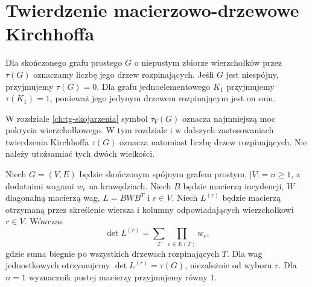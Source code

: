 \section{Twierdzenie macierzowo-drzewowe Kirchhoffa}
\label{sec:tg-matrix-tree}

\begin{definicja}
Dla skończonego grafu prostego $G$ o niepustym
zbiorze wierzchołków przez $\tau(G)$ oznaczamy liczbę jego drzew rozpinających.
Jeśli $G$ jest niespójny, przyjmujemy $\tau(G)=0$.
Dla grafu jednoelementowego $K_1$ przyjmujemy
$\tau(K_1)=1$, ponieważ jego jedynym drzewem
rozpinającym jest on sam.
\end{definicja}

\begin{uwaga}
W rozdziale \ref{ch:tg-skojarzenia} symbol
$\tau_V(G)$ oznacza najmniejszą moc pokrycia
wierzchołkowego. W tym rozdziale i w dalszych
zastosowaniach twierdzenia Kirchhoffa
$\tau(G)$ oznacza natomiast liczbę drzew
rozpinających. Nie należy utożsamiać
tych dwóch wielkości.
\end{uwaga}

\begin{twierdzenie}
\label{thm:tg-kirchhoff}
Niech $G=(V,E)$ będzie skończonym spójnym grafem prostym,
$|V|=n\ge1$, z dodatnimi wagami $w_e$ na krawędziach.
Niech $B$ będzie macierzą incydencji, $W$ diagonalną
macierzą wag, $L=BWB^T$ i $r\in V$. Niech $L^{(r)}$
będzie macierzą otrzymaną
przez skreślenie wiersza i kolumny odpowiadających
wierzchołkowi $r\in V$. Wówczas
\[
\det L^{(r)}=\sum_{T}\prod_{e\in E(T)}w_e,
\]
gdzie suma biegnie po wszystkich drzewach rozpinających $T$.
Dla wag jednostkowych otrzymujemy
$\det L^{(r)}=\tau(G)$, niezależnie od wyboru $r$.
Dla $n=1$ wyznacznik pustej macierzy przyjmujemy równy $1$.
\end{twierdzenie}

